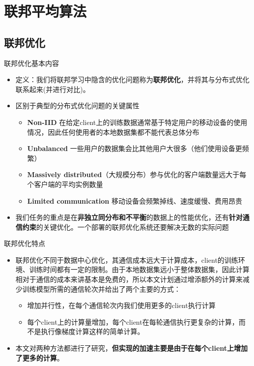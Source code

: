 \documentclass{beamer}
\begin{document}
\section{联邦平均算法}
\subsection{联邦优化}
\begin{frame}{\songti 联邦优化基本内容}
    \begin{itemize}
        \item 定义：我们将联邦学习中隐含的优化问题称为\textbf{联邦优化}，并将其与分布式优化联系起来(并进行对比)。
        \item 区别于典型的分布式优化问题的关键属性
        \begin{itemize}
            \item \textbf{Non-IID} 在给定client上的训练数据通常基于特定用户的移动设备的使用情况，因此任何使用者的本地数据集都不能代表总体分布
            \item \textbf{Unbalanced} 一些用户的数据集会比其他用户大很多（他们使用设备更频繁）
            \item \textbf{Massively distributed}（大规模分布）参与优化的客户端数量远大于每个客户端的平均实例数量
            \item \textbf{Limited communication} 移动设备会频繁掉线、速度缓慢、费用昂贵
        \end{itemize}
        \item 我们任务的重点是在\textbf{非独立同分布和不平衡}的数据上的性能优化，还有\textbf{针对通信约束}的关键优化。一个部署的联邦优化系统还要解决无数的实际问题
    \end{itemize}
\end{frame}
\begin{frame}{\songti 联邦优化特点}
    \begin{itemize}
        \item 联邦优化不同于数据中心优化，其通信成本远大于计算成本，client的训练环境、训练时间都有一定的限制。由于本地数据集远小于整体数据集，因此计算相对于通信的成本来讲基本是免费的，所以本文计划通过增添额外的计算来减少训练模型所需的通信轮次并给出了两个主要的方式：
        \begin{itemize}
            \item 增加并行性，在每个通信轮次内我们使用更多的client执行计算
            \item 每个client上的计算量增加，每个client在每轮通信执行更复杂的计算，而不是执行像梯度计算这样的简单计算。
        \end{itemize}
        \item 本文对两种方法都进行了研究，\textbf{但实现的加速主要是由于在每个client上增加了更多的计算}。
    \end{itemize}
\end{frame}
\end{document}
